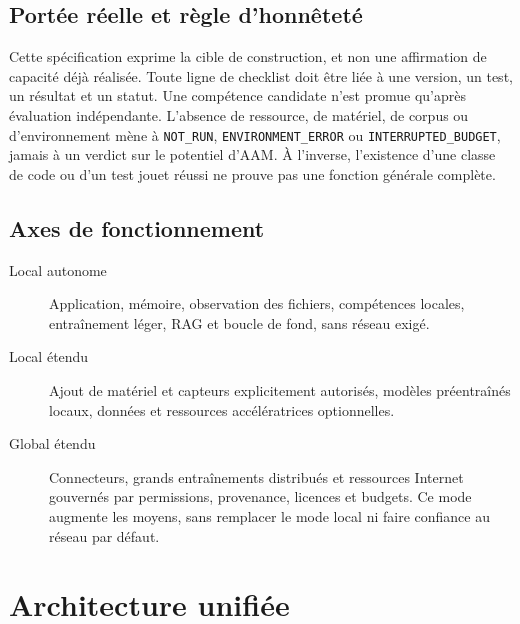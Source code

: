 \documentclass[11pt,a4paper,oneside]{report}
\begin{document}
\section{Portée réelle et règle d'honnêteté}
Cette spécification exprime la cible de construction, et non une affirmation de capacité déjà réalisée. Toute ligne de checklist doit être liée à une version, un test, un résultat et un statut. Une compétence candidate n'est promue qu'après évaluation indépendante. L'absence de ressource, de matériel, de corpus ou d'environnement mène à \texttt{NOT\_RUN}, \texttt{ENVIRONMENT\_ERROR} ou \texttt{INTERRUPTED\_BUDGET}, jamais à un verdict sur le potentiel d'AAM. À l'inverse, l'existence d'une classe de code ou d'un test jouet réussi ne prouve pas une fonction générale complète.

\section{Axes de fonctionnement}
\begin{description}
\item[Local autonome] Application, mémoire, observation des fichiers, compétences locales, entraînement léger, RAG et boucle de fond, sans réseau exigé.
\item[Local étendu] Ajout de matériel et capteurs explicitement autorisés, modèles préentraînés locaux, données et ressources accélératrices optionnelles.
\item[Global étendu] Connecteurs, grands entraînements distribués et ressources Internet gouvernés par permissions, provenance, licences et budgets. Ce mode augmente les moyens, sans remplacer le mode local ni faire confiance au réseau par défaut.
\end{description}

\chapter{Architecture unifiée}
\end{document}
